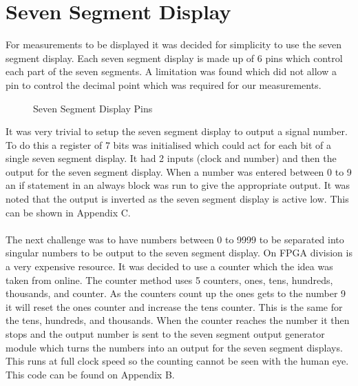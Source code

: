 \documentclass[a4paper,12pt]{article}
\begin{document}
\section{Seven Segment Display}
\begin{flushleft}
For measurements to be displayed it was decided for simplicity to use the seven segment display. Each seven segment display is made up of 6 pins which control each part of the seven segments. A limitation was found which did not allow a pin to control the decimal point which was required for our measurements. 
\begin{figure}[H]
	\centering
	\caption{Seven Segment Display Pins \cite{terasic_2014}}
\end{figure}
It was very trivial to setup the seven segment display to output a signal number. To do this a register of 7 bits was initialised which could act for each bit of a single seven segment display. It had 2 inputs (clock and number) and then the output for the seven segment display. When a number was entered between 0 to 9 an if statement in an always block was run to give the appropriate output. It was noted that the output is inverted as the seven segment display is active low. This can be shown in Appendix C.
\\ \- \\
The next challenge was to have numbers between 0 to 9999 to be separated into singular numbers to be output to the seven segment display. On FPGA division is a very expensive resource. It was decided to use a counter which the idea was taken from online. \cite{stack_overflow} The counter method uses 5 counters, ones, tens, hundreds, thousands, and counter. As the counters count up the ones gets to the number 9 it will reset the ones counter and increase the tens counter. This is the same for the tens, hundreds, and thousands. When the counter reaches the number it then stops and the output number is sent to the seven segment output generator module which turns the numbers into an output for the seven segment displays. This runs at full clock speed so the counting cannot be seen with the human eye. This code can be found on Appendix B.
\end{flushleft}
\newpage
\end{document}
